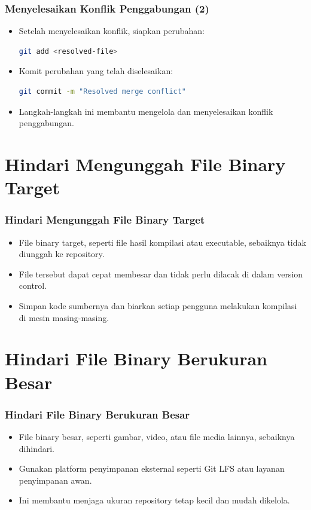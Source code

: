 \documentclass[aspectratio=169, table]{beamer}
\begin{document}
	\begin{frame}[fragile]
		\frametitle{Menyelesaikan Konflik Penggabungan (2)}
		\vspace{20pt}
		\begin{itemize}
			\item Setelah menyelesaikan konflik, siapkan perubahan:
			\begin{lstlisting}[language=bash]
				git add <resolved-file>
			\end{lstlisting}
			\item Komit perubahan yang telah diselesaikan:
			\begin{lstlisting}[language=bash]
				git commit -m "Resolved merge conflict"
			\end{lstlisting}
			\item Langkah-langkah ini membantu mengelola dan menyelesaikan konflik penggabungan.
		\end{itemize}
	\end{frame}
	
	
	\section{Hindari Mengunggah File Binary Target}
	\begin{frame}[fragile]
		\frametitle{Hindari Mengunggah File Binary Target}
		\begin{itemize}
			\item File binary target, seperti file hasil kompilasi atau executable, sebaiknya tidak diunggah ke repository.
			\item File tersebut dapat cepat membesar dan tidak perlu dilacak di dalam version control.
			\item Simpan kode sumbernya dan biarkan setiap pengguna melakukan kompilasi di mesin masing-masing.
		\end{itemize}
	\end{frame}
	
	\section{Hindari File Binary Berukuran Besar}
	\begin{frame}[fragile]
		\frametitle{Hindari File Binary Berukuran Besar}
		\begin{itemize}
			\item File binary besar, seperti gambar, video, atau file media lainnya, sebaiknya dihindari.
			\item Gunakan platform penyimpanan eksternal seperti Git LFS atau layanan penyimpanan awan.
			\item Ini membantu menjaga ukuran repository tetap kecil dan mudah dikelola.
		\end{itemize}
	\end{frame}
	
\end{document}
